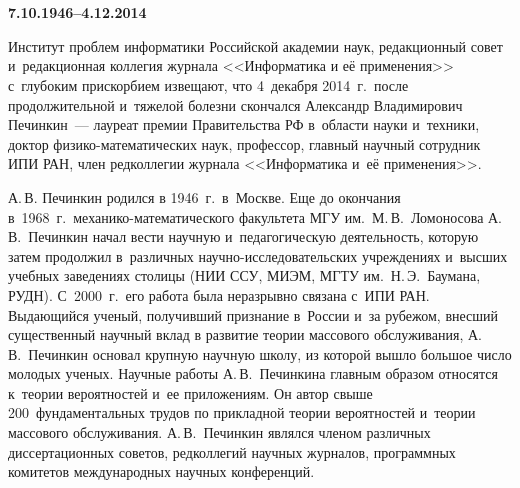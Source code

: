    \vspace*{-36pt}

\begin{center}
\vspace*{6pt}
\mbox{%
\epsfxsize=56mm %
}
\end{center}

\vspace*{6pt} %


   \begin{center}
\\[12pt]
\textbf{\large 7.10.1946--4.12.2014}
   \end{center}


   \vspace*{3mm}

   \thispagestyle{empty}





Институт проблем информатики Российской академии наук, редакционный совет
и~редакционная коллегия журнала <<Информатика и её применения>> с~глубоким
прискорбием извещают,  что 4~декабря 2014~г.\ после продолжительной
и~тяжелой болезни скончался Александр Владимирович Печинкин~--- лауреат
премии Правительства РФ в~области науки и~техники, доктор
физико-математических наук, профессор, главный научный сотрудник ИПИ РАН,
член редколлегии журнала <<Информатика и~её применения>>.

А.\,В. Печинкин родился в 1946~г.\ в~Москве. Еще до окончания в~1968~г.\
механико-математического факультета  МГУ им.\ М.\,В.~Ломоносова А.\,В.~Печинкин
начал вести научную и~педагогическую деятельность, которую затем
продолжил в~различных на\-уч\-но-ис\-сле\-до\-ва\-тель\-ских учреждениях
и~высших учебных заведениях столицы (НИИ ССУ, МИЭМ, МГТУ им.\ Н.\,Э.~Баумана,
РУДН). С~2000~г.\ его работа была неразрывно связана с~ИПИ РАН.
Выдающийся ученый, получивший признание в~России и~за рубежом, внесший
существенный научный вклад в развитие теории массового обслуживания,
А.\,В.~Печинкин основал крупную научную школу, из которой вышло большое
число молодых ученых. Научные работы А.\,В.~Печинкина главным образом
относятся к~теории вероятностей и~ее приложениям. Он автор свыше
200~фундаментальных трудов по прикладной теории вероятностей и~теории массового обслуживания. А.\,В.~Печинкин являлся членом различных диссертационных советов, редколлегий научных журналов, программных комитетов международных научных конференций.

